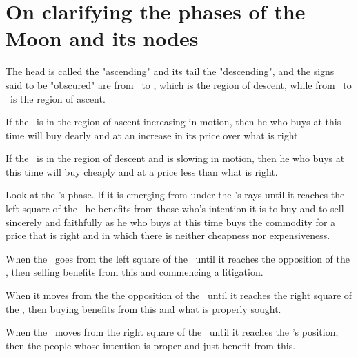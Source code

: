 \section{On clarifying the phases of the Moon and its nodes}

The head is called the "ascending" and its tail the "descending", and the signs said to be "obscured" are from \Leo\ to \Capricorn, which is the region of descent, while from \Aquarius\ to \Cancer\ is the region of ascent. 

If the \Moon\ is in the region of ascent increasing in motion, then he who buys at this time will buy dearly and at an increase in its price over what is right.

If the \Moon\ is in the region of descent and is slowing in motion, then he who buys at this time will buy cheaply and at a price less than what is right.

Look at the \Moon's phase. If it is emerging from under the \Sun's rays until it reaches the left square of the \Sun\, he benefits from those who's intention it is to buy and to sell sincerely and faithfully as he who buys at this time buys the commodity for a price that is right and in which there is neither cheapness nor expensiveness.

When the \Moon\ goes from the left square of the \Sun\ until it reaches the opposition of the \Sun, then selling benefits from this and commencing a litigation. 

When it moves from the the opposition of the \Sun\ until it reaches the right square of the \Sun, then buying benefits from this and what is properly sought.

When the \Moon\ moves from the right square of the \Sun\ until it reaches the \Sun's position, then the people whose intention is proper and just benefit from this.

